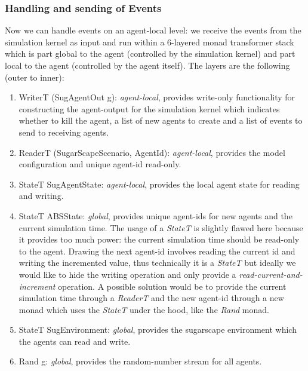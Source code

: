 \subsubsection{Handling and sending of Events}
Now we can handle events on an agent-local level: we receive the events from the simulation kernel as input and run within a 6-layered monad transformer stack which is part global to the agent (controlled by the simulation kernel) and part local to the agent (controlled by the agent itself). The layers are the following (outer to inner):

\begin{enumerate}
	\item WriterT (SugAgentOut g): \textit{agent-local}, provides write-only functionality for constructing the agent-output for the simulation kernel which indicates whether to kill the agent, a list of new agents to create and a list of events to send to receiving agents.
	\item ReaderT (SugarScapeScenario, AgentId): \textit{agent-local}, provides the model configuration and unique agent-id read-only.
	\item StateT SugAgentState: \textit{agent-local}, provides the local agent state for reading and writing.
	\item StateT ABSState: \textit{global}, provides unique agent-ids for new agents and the current simulation time. The usage of a \textit{StateT} is slightly flawed here because it provides too much power: the current simulation time should be read-only to the agent. Drawing the next agent-id involves reading the current id and writing the incremented value, thus technically it is a \textit{StateT} but ideally we would like to hide the writing operation and only provide a \textit{read-current-and-increment} operation. A possible solution would be to provide the current simulation time through a \textit{ReaderT} and the new agent-id through a new monad which uses the \textit{StateT} under the hood, like the \textit{Rand} monad.
	\item StateT SugEnvironment: \textit{global}, provides the sugarscape environment which the agents can read and write.
	\item Rand g: \textit{global}, provides the random-number stream for all agents.
\end{enumerate}

